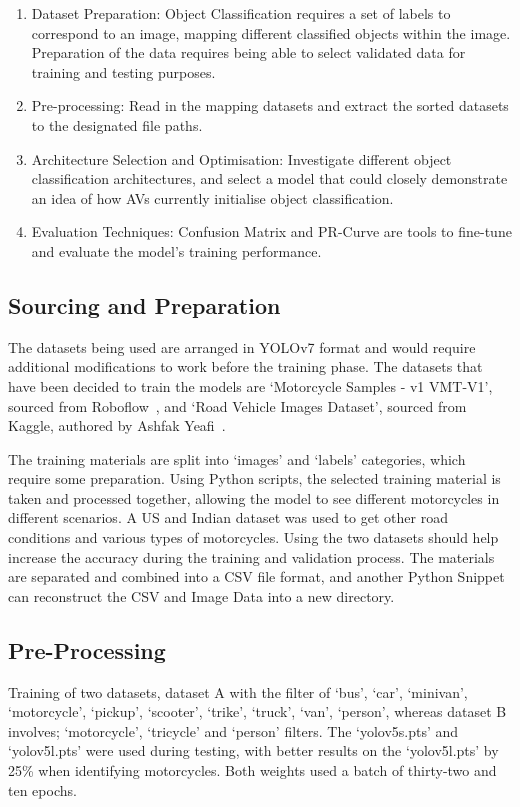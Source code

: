 \documentclass[conference]{IEEEtran}
\begin{document}
        \begin{enumerate}
            \item Dataset Preparation: Object Classification requires a set of labels to correspond to an image, mapping different classified objects within the image. Preparation of the data requires being able to select validated data for training and testing purposes.
            \item Pre-processing: Read in the mapping datasets and extract the sorted datasets to the designated file paths. 
            \item Architecture Selection and Optimisation: Investigate different object classification architectures, and select a model that could closely demonstrate an idea of how AVs currently initialise object classification.
            \item Evaluation Techniques: Confusion Matrix and PR-Curve are tools to fine-tune and evaluate the model's training performance.
        \end{enumerate}

	\subsection{Sourcing and Preparation}
		The datasets being used are arranged in YOLOv7 format and would require additional modifications to work before the training phase. The datasets that have been decided to train the models are `Motorcycle Samples - v1 VMT-V1', sourced from Roboflow~\cite{roboflow_motorcycle_nodate}, and `Road Vehicle Images Dataset', sourced from Kaggle, authored by Ashfak Yeafi~\cite{ashfak_yeafi_road_nodate}.

		The training materials are split into `images' and `labels' categories, which require some preparation. Using Python scripts, the selected training material is taken and processed together, allowing the model to see different motorcycles in different scenarios. A US and Indian dataset was used to get other road conditions and various types of motorcycles. Using the two datasets should help increase the accuracy during the training and validation process. The materials are separated and combined into a CSV file format, and another Python Snippet can reconstruct the CSV and Image Data into a new directory.

	\subsection{Pre-Processing}
	\label{subsec:preprocessing}
		Training of two datasets, dataset A with the filter of `bus', `car', `minivan', `motorcycle', `pickup', `scooter', `trike', `truck', `van', `person', whereas dataset B involves; `motorcycle', `tricycle' and `person' filters. The `yolov5s.pts' and `yolov5l.pts' were used during testing, with better results on the `yolov5l.pts' by 25\% when identifying motorcycles. Both weights used a batch of thirty-two and ten epochs.
\end{document}
